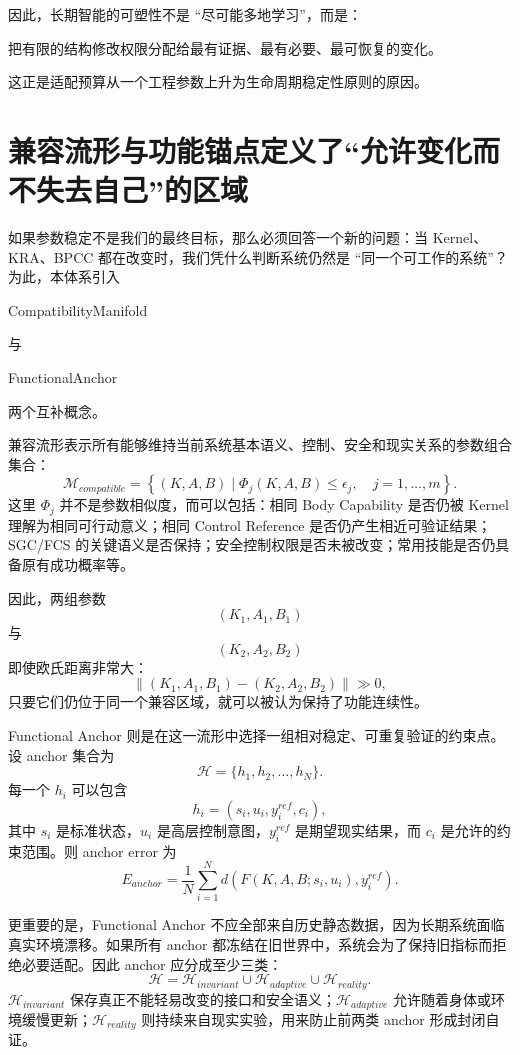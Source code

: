 因此，长期智能的可塑性不是 ``尽可能多地学习''，而是：
\begin{statementbox}
把有限的结构修改权限分配给最有证据、最有必要、最可恢复的变化。
\end{statementbox}
这正是适配预算从一个工程参数上升为生命周期稳定性原则的原因。

\section{兼容流形与功能锚点定义了“允许变化而不失去自己”的区域}

如果参数稳定不是我们的最终目标，那么必须回答一个新的问题：当 Kernel、KRA、BPCC 都在改变时，我们凭什么判断系统仍然是 ``同一个可工作的系统''？为此，本体系引入
\begin{statementbox}
CompatibilityManifold
\end{statementbox}
与
\begin{statementbox}
FunctionalAnchor
\end{statementbox}
两个互补概念。

兼容流形表示所有能够维持当前系统基本语义、控制、安全和现实关系的参数组合集合：
\[
\mathcal M_{compatible}
=
\left\{
(K,A,B)
\mid
\Phi_j(K,A,B)\leq \epsilon_j,
\quad
j=1,\ldots,m
\right\}.
\]
这里 $\Phi_j$ 并不是参数相似度，而可以包括：相同 Body Capability 是否仍被 Kernel 理解为相同可行动意义；相同 Control Reference 是否仍产生相近可验证结果；SGC/FCS 的关键语义是否保持；安全控制权限是否未被改变；常用技能是否仍具备原有成功概率等。

因此，两组参数
\[
(K_1,A_1,B_1)
\]
与
\[
(K_2,A_2,B_2)
\]
即使欧氏距离非常大：
\[
\left\|
(K_1,A_1,B_1)
-
(K_2,A_2,B_2)
\right\|
\gg 0,
\]
只要它们仍位于同一个兼容区域，就可以被认为保持了功能连续性。

Functional Anchor 则是在这一流形中选择一组相对稳定、可重复验证的约束点。设 anchor 集合为
\[
\mathcal H
=
\{h_1,h_2,\ldots,h_N\}.
\]
每一个 $h_i$ 可以包含
\[
h_i
=
(s_i,u_i,y_i^{ref},c_i),
\]
其中 $s_i$ 是标准状态，$u_i$ 是高层控制意图，$y_i^{ref}$ 是期望现实结果，而 $c_i$ 是允许的约束范围。则 anchor error 为
\[
E_{anchor}
=
\frac{1}{N}
\sum_{i=1}^{N}
d
\left(
F(K,A,B;s_i,u_i),
y_i^{ref}
\right).
\]

更重要的是，Functional Anchor 不应全部来自历史静态数据，因为长期系统面临真实环境漂移。如果所有 anchor 都冻结在旧世界中，系统会为了保持旧指标而拒绝必要适配。因此 anchor 应分成至少三类：
\[
\mathcal H
=
\mathcal H_{invariant}
\cup
\mathcal H_{adaptive}
\cup
\mathcal H_{reality}.
\]
$\mathcal H_{invariant}$ 保存真正不能轻易改变的接口和安全语义；$\mathcal H_{adaptive}$ 允许随着身体或环境缓慢更新；$\mathcal H_{reality}$ 则持续来自现实实验，用来防止前两类 anchor 形成封闭自证。

